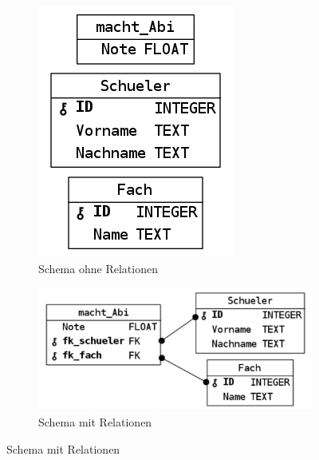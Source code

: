 \begin{description}
\begin{figure}[h]
  \begin{subfigure}[b]{0.45\textwidth}
    \includegraphics[width=\textwidth]{images/att-no-rel.png}
    \caption{Schema ohne Relationen}
    \label{pic:no-rel}
  \end{subfigure}\hfill
  \begin{subfigure}[b]{0.45\textwidth}
    \includegraphics[width=\textwidth]{images/att-with-rel.png}
    \caption{Schema mit Relationen}
    \label{pic:with-rel}
  \end{subfigure}
\end{figure}



\end{description}
